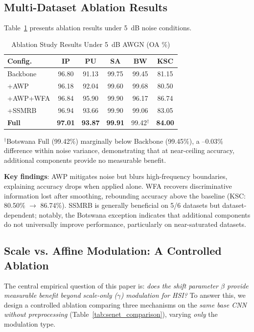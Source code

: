 \documentclass[pdflatex,sn-mathphys-num]{sn-jnl}
\theoremstyle{thmstyleone}
\theoremstyle{thmstyletwo}
\theoremstyle{thmstylethree}
\begin{document}
\subsection{Multi-Dataset Ablation Results}

Table~\ref{tab:ablation} presents ablation results under 5~dB noise conditions.

\begin{table}[!t]
\caption{Ablation Study Results Under 5~dB AWGN (OA \%)}
\label{tab:ablation}
\centering

\begin{tabular}{lccccc}
\toprule
\textbf{Config.} & \textbf{IP} & \textbf{PU} & \textbf{SA} & \textbf{BW} & \textbf{KSC} \\
\midrule
Backbone & 96.80 & 91.13 & 99.75 & 99.45 & 81.15 \\
+AWP & 96.18 & 92.04 & 99.60 & 99.68 & 80.50 \\
+AWP+WFA & 96.84 & 95.90 & 99.90 & 96.17 & 86.74 \\
+SSMRB & 96.94 & 93.66 & 99.90 & 99.06 & 83.05 \\
\textbf{Full} & \textbf{97.01} & \textbf{93.87} & \textbf{99.91} & 99.42$^\dagger$ & \textbf{84.00} \\
\bottomrule
\end{tabular}
\begin{flushleft}
\footnotesize{$^\dagger$Botswana Full (99.42\%) marginally below Backbone (99.45\%), a --0.03\% difference within noise variance, demonstrating that at near-ceiling accuracy, additional components provide no measurable benefit.}
\end{flushleft}
\end{table}

\textbf{Key findings}: AWP mitigates noise but blurs high-frequency boundaries, explaining accuracy drops when applied alone. WFA recovers discriminative information lost after smoothing, rebounding accuracy above the baseline (KSC: 80.50\% $\to$ 86.74\%). SSMRB is generally beneficial on 5/6 datasets but dataset-dependent; notably, the Botswana exception indicates that additional components do not universally improve performance, particularly on near-saturated datasets.

\subsection{Scale vs. Affine Modulation: A Controlled Ablation}
\label{sec:senet_ablation}

The central empirical question of this paper is: \textit{does the shift parameter $\beta$ provide measurable benefit beyond scale-only ($\gamma$) modulation for HSI?} To answer this, we design a controlled ablation comparing three mechanisms on the \textit{same base CNN without preprocessing} (Table~\ref{tab:senet_comparison}), varying \textit{only} the modulation type.
\end{document}
